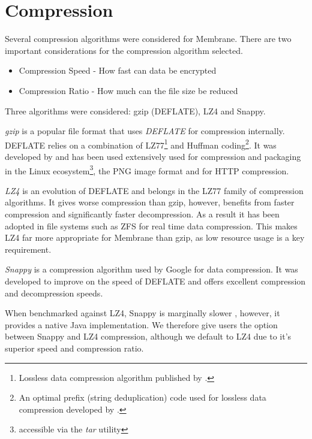 \documentclass[11pt, a4paper, twoside]{report}
\begin{document}
\section{Compression} \label{sec:compression}

Several compression algorithms were considered for Membrane. There are two important considerations for the compression algorithm selected.

\begin{itemize}
 \item Compression Speed - How fast can data be encrypted
 \item Compression Ratio - How much can the file size be reduced
\end{itemize}

Three algorithms were considered: gzip (DEFLATE), LZ4 and Snappy.

\emph{gzip} is a popular file format that uses \emph{DEFLATE} for compression internally. DEFLATE relies on a combination of LZ77\footnote{Lossless data compression algorithm published by \cite{ziv1977universal}.} and Huffman coding\footnote{An optimal prefix (string deduplication) code used for lossless data compression developed by \cite{huffman1952method}.}. It was developed by \cite{deutsch1996deflate} and has been used extensively used for compression and packaging in the Linux ecosystem\footnote{accessible via the \emph{tar} utility}, the PNG image format and for HTTP compression.

\emph{LZ4} is an evolution of DEFLATE and belongs in the LZ77 family of compression algorithms. It gives worse compression than gzip, however, benefits from faster compression and significantly faster decompression. \citep{legesse2014performance} As a result it has been adopted in file systems such as ZFS for real time data compression. This makes LZ4 far more appropriate for Membrane than gzip, as low resource usage is a key requirement.

\emph{Snappy} is a compression algorithm used by Google for data compression. It was developed to improve on the speed of DEFLATE and offers excellent compression and decompression speeds. \citep{google2017snappy}

When benchmarked against LZ4, Snappy is marginally slower \citep{vorontsov2015compression}, however, it provides a native Java implementation. We therefore give users the option between Snappy and LZ4 compression, although we default to LZ4 due to it's superior speed and compression ratio. \citep{lz42017lz4}
\end{document}
